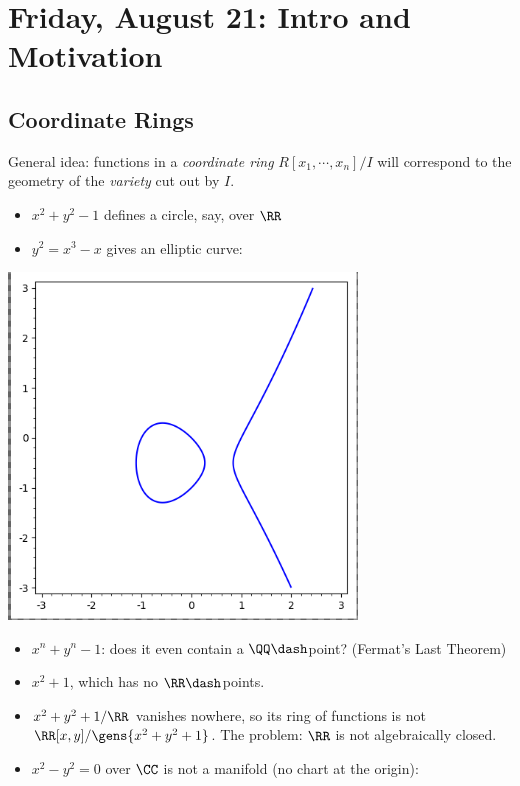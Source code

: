 \hypertarget{friday-august-21-intro-and-motivation}{%
\section{Friday, August 21: Intro and
Motivation}\label{friday-august-21-intro-and-motivation}}

\hypertarget{coordinate-rings}{%
\subsection{Coordinate Rings}\label{coordinate-rings}}

General idea: functions in a \emph{coordinate ring}
\(R[x_1, \cdots, x_n]/I\) will correspond to the geometry of the
\emph{variety} cut out by \(I\).

\begin{example}

\envlist

\begin{itemize}
\item
  \(x^2 + y^2 - 1\) defines a circle, say, over \(\RR\)
\item
  \(y^2 = x^3-x\) gives an elliptic curve:
\end{itemize}

\includegraphics[width=3.64583in,height=\textheight]{figures/image_2020-08-21-01-04-22.png}

\begin{itemize}
\item
  \(x^n+y^n-1\): does it even contain a \(\QQ\dash\)point? (Fermat's
  Last Theorem)
\item
  \(x^2 + 1\), which has no \(\RR\dash\)points.
\item
  \(x^2 + y^2 + 1/\RR\) vanishes nowhere, so its ring of functions is
  not \(\RR[x, y] / \gens{x^2 + y^2 + 1}\). The problem: \(\RR\) is not
  algebraically closed.
\item
  \(x^2 - y^2 = 0\) over \(\CC\) is not a manifold (no chart at the
  origin):
\end{itemize}


\end{example}
